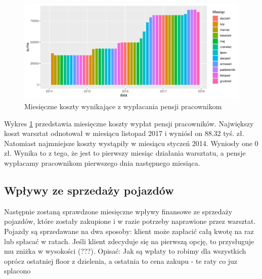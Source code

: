\documentclass{article}\usepackage[]{graphicx}\usepackage[]{xcolor}
\makeatletter
\def\maxwidth{ %
  \ifdim\Gin@nat@width>\linewidth
    \linewidth
  \else
    \Gin@nat@width
  \fi
}
\newenvironment{knitrout}{}{} %
\makeatother
\begin{document}
\begin{knitrout}
\color{fgcolor}\begin{figure}[H]

{\centering \includegraphics[width=\maxwidth]{figure/fig_pracownicy-1} 

}

\caption[Miesięczne koszty wynikające z wypłacania pensji pracownikom]{Miesięczne koszty wynikające z wypłacania pensji pracownikom}\label{fig:fig_pracownicy}
\end{figure}

\end{knitrout}

Wykres \ref{fig:fig_pracownicy} przedstawia miesięczne koszty wypłat pensji pracowników. Największy koszt warsztat odnotował w miesiącu listopad 2017 i wyniósł on 88.32 tyś. zł. 
Natomiast najmniejsze koszty wystąpiły w miesiącu styczeń 2014. Wyniosły one 0 zł. Wynika to z tego, że jest to pierwszy miesiąc działania warsztatu, a pensje wypłacamy pracownikom pierwszego dnia następnego miesiąca.

\subsection{Wpływy ze sprzedaży pojazdów}

Następnie zostaną sprawdzone miesięczne wpływy finansowe ze sprzedaży pojazdów, które zostały zakupione i w razie potrzeby naprawione przez warsztat. Pojazdy są sprzedawane na dwa sposoby: klient może zapłacić całą kwotę na raz lub spłacać w ratach. {\color{red}Jeśli klient zdecyduje się na pierwszą opcję, to przysługuje mu zniżka w wysokości (???).} {\color{red}Opisać: Jak są wpłaty to robimy dla wszystkich oprócz ostatniej floor z dzielenia, a ostatnia to cena zakupu - te raty co juz splacono}
\end{document}
